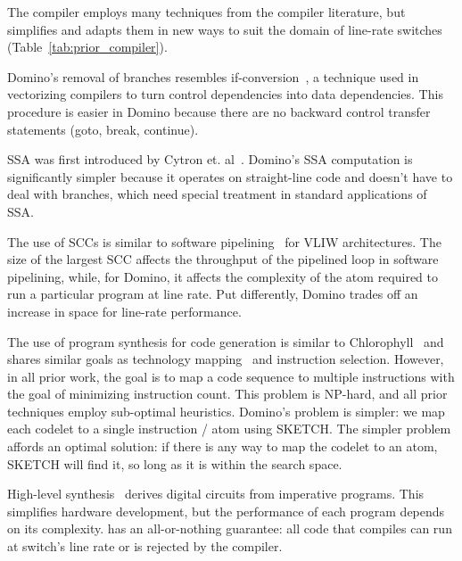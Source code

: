 The \pktlanguage compiler employs many techniques from the compiler literature,
but simplifies and adapts them in new ways to suit the domain of line-rate
switches (Table~\ref{tab:prior_compiler}).
\begin{CompactEnumerate}
  \item Domino's removal of branches resembles
    if-conversion~\cite{if_conversion}, a technique used in vectorizing
    compilers to turn control dependencies into data dependencies. This
    procedure is easier in Domino because there are no backward control
    transfer statements (goto, break, continue).
  \item SSA was first introduced by Cytron et. al~\cite{ssa}. Domino's SSA
    computation is significantly simpler because it operates on straight-line
    code and doesn't have to deal with branches, which need special treatment
    in standard applications of SSA.
  \item The use of SCCs is similar to software
    pipelining~\cite{software_pipelining} for VLIW architectures. The size of
    the largest SCC affects the throughput of the pipelined loop in software
    pipelining, while, for Domino, it affects the complexity of the atom
    required to run a particular program at line rate. Put differently, Domino
    trades off an increase in space for line-rate performance.
  \item The use of program synthesis for code generation is similar to
    Chlorophyll~\cite{Chlorophyll} and shares similar goals as technology
    mapping~\cite{micheli, flowmap, spectransform} and instruction selection.
    However, in all prior work, the goal is to map a code sequence to multiple
    instructions with the goal of minimizing instruction count. This problem is
    NP-hard, and all prior techniques employ sub-optimal heuristics.  Domino's
    problem is simpler: we map each codelet to a single instruction / atom
    using SKETCH. The simpler problem affords an optimal solution: if there is
    any way to map the codelet to an atom, SKETCH will find it, so long as it
    is within the search space.
  \item High-level synthesis~\cite{nurvadathi, cash, bluespec, vivado} derives
    digital circuits from imperative programs. This simplifies hardware
    development, but the performance of each program depends on its complexity.
    \pktlanguage has an all-or-nothing guarantee: all code that compiles can
    run at switch's line rate or is rejected by the compiler.
\end{CompactEnumerate}
